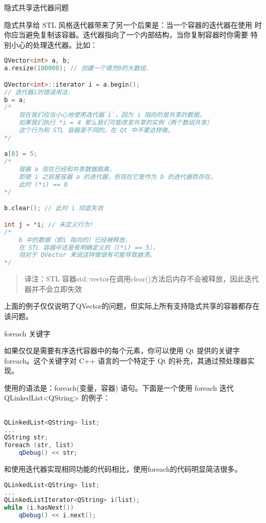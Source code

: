 隐式共享迭代器问题

隐式共享给 STL 风格迭代器带来了另一个后果是：当一个容器的迭代器在使用
时你应当避免复制该容器。迭代器指向了一个内部结构，当你复制容器时你需要
特别小心的处理迭代器。比如：


\begin{lstlisting}[language=C++]
QVector<int> a, b;
a.resize(100000); // 创建一个填充0的大数组.

QVector<int>::iterator i = a.begin();
// 迭代器i的错误用法:
b = a;
/*
    现在我们应当小心地使用迭代器`i`，因为 i 指向的是共享的数据。
    如果我们执行 *i = 4 那么我们可能改变共享的实例（两个数组共享）
    这个行为和 STL 容器是不同的。在 Qt 中不要这样做。
*/

a[0] = 5;
/*
    容器 a 现在已经和共享数据脱离，
    即使 i 之前是容器 a 的迭代器，但现在它是作为 b 的迭代器而存在。
    此时 (*i) == 0
*/

b.clear(); // 此时 i 彻底失效

int j = *i; // 未定义行为!
/*
    b 中的数据（即i 指向的）已经被释放，
    在 STL 容器中这是有明确定义的（(*i) == 5），
    但对于 QVector 来说这样做很有可能导致崩溃。
*/
\end{lstlisting}

\begin{quote}
译注：STL 容器std::vector在调用clear()方法后内存不会被释放，因此迭代器并不会立即失效
\end{quote}

上面的例子仅仅说明了QVector的问题，但实际上所有支持隐式共享的容器都存在该问题。

\splitLine

foreach 关键字

如果仅仅是需要有序迭代容器中的每个元素，你可以使用 Qt 提供的关键字 foreach。这个关键字对 C++ 语言的一个特定于 Qt 的补充，其通过预处理器实现。

使用的语法是：foreach(变量，容器) 语句。下面是一个使用 foreach 迭代 QLinkedList<QString> 的例子：

\begin{lstlisting}[language=C++]

QLinkedList<QString> list;
...
QString str;
foreach (str, list)
    qDebug() << str;
\end{lstlisting}

和使用迭代器实现相同功能的代码相比，使用foreach的代码明显简洁很多。

\begin{lstlisting}[language=C++]
QLinkedList<QString> list;
...
QLinkedListIterator<QString> i(list);
while (i.hasNext())
    qDebug() << i.next();
\end{lstlisting}

